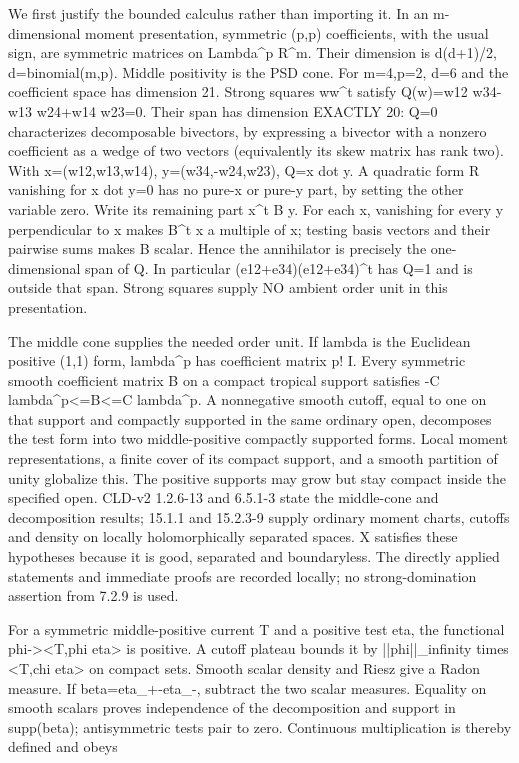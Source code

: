 \documentclass[11pt]{article}
\begin{document}
We first justify the bounded calculus rather than importing it. In an m-dimensional moment presentation, symmetric (p,p) coefficients, with the usual sign, are symmetric matrices on Lambda\textasciicircum{}p R\textasciicircum{}m. Their dimension is d(d+1)/2, d=binomial(m,p). Middle positivity is the PSD cone. For m=4,p=2, d=6 and the coefficient space has dimension 21. Strong squares ww\textasciicircum{}t satisfy Q(w)=w12 w34-w13 w24+w14 w23=0. Their span has dimension EXACTLY 20: Q=0 characterizes decomposable bivectors, by expressing a bivector with a nonzero coefficient as a wedge of two vectors (equivalently its skew matrix has rank two). With x=(w12,w13,w14), y=(w34,-w24,w23), Q=x dot y. A quadratic form R vanishing for x dot y=0 has no pure-x or pure-y part, by setting the other variable zero. Write its remaining part x\textasciicircum{}t B y. For each x, vanishing for every y perpendicular to x makes B\textasciicircum{}t x a multiple of x; testing basis vectors and their pairwise sums makes B scalar. Hence the annihilator is precisely the one-dimensional span of Q. In particular (e12+e34)(e12+e34)\textasciicircum{}t has Q=1 and is outside that span. Strong squares supply NO ambient order unit in this presentation.

The middle cone supplies the needed order unit. If lambda is the Euclidean positive (1,1) form, lambda\textasciicircum{}p has coefficient matrix p! I. Every symmetric smooth coefficient matrix B on a compact tropical support satisfies -C lambda\textasciicircum{}p<=B<=C lambda\textasciicircum{}p. A nonnegative smooth cutoff, equal to one on that support and compactly supported in the same ordinary open, decomposes the test form into two middle-positive compactly supported forms. Local moment representations, a finite cover of its compact support, and a smooth partition of unity globalize this. The positive supports may grow but stay compact inside the specified open. CLD-v2 1.2.6-13 and 6.5.1-3 state the middle-cone and decomposition results; 15.1.1 and 15.2.3-9 supply ordinary moment charts, cutoffs and density on locally holomorphically separated spaces. X satisfies these hypotheses because it is good, separated and boundaryless. The directly applied statements and immediate proofs are recorded locally; no strong-domination assertion from 7.2.9 is used.

For a symmetric middle-positive current T and a positive test eta, the functional phi-><T,phi eta> is positive. A cutoff plateau bounds it by ||phi||\_infinity times <T,chi eta> on compact sets. Smooth scalar density and Riesz give a Radon measure. If beta=eta\_+-eta\_-, subtract the two scalar measures. Equality on smooth scalars proves independence of the decomposition and support in supp(beta); antisymmetric tests pair to zero. Continuous multiplication is thereby defined and obeys
\end{document}
